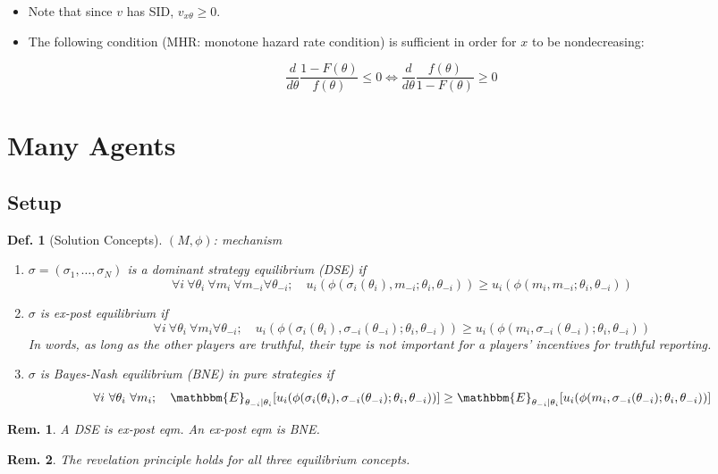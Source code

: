 \documentclass[11pt,a4paper,dvipdfmx]{article}
\theoremstyle{plain}
\newtheorem{df}{Def.}[section]
\newtheorem{rem}{Rem.}[section]
\newcommand{\equi}{\Longleftrightarrow}
\newcommand{\E}{\mathbbm{E}}
\newcommand{\1}{\mathbbm{1}}
\begin{document}
\begin{itemize}
	\item Note that since $v$ has SID, $v_{x \theta} \geq 0$.
	\item The following condition (MHR: monotone hazard rate condition) is sufficient in order for $x$ to be nondecreasing:
\end{itemize}
\[
\frac{d}{d\theta}\frac{1 - F(\theta)}{f(\theta)} \leq 0
\equi \frac{d}{d\theta}\frac{f(\theta)}{1 - F(\theta)} \geq 0
\]


\newpage
\section{Many Agents}

\subsection{Setup}
\begin{df}[Solution Concepts] $(M, \phi)$: mechanism
	\begin{enumerate}
		\item $\sigma = (\sigma_1, \dots, \sigma_N)$ is a dominant strategy equilibrium (DSE) if
		\[
		\forall i \ \forall \theta_i \ \forall m_i \ \forall m_{-i} \forall \theta_{-i}; \quad
		u_i(\phi(\sigma_i(\theta_i), m_{-i} ; \theta_i, \theta_{-i}))
		\geq u_i(\phi(m_i, m_{-i} ; \theta_i, \theta_{-i}))
		\]
		\item $\sigma$ is ex-post equilibrium if
		\[
		\forall i \ \forall \theta_i \ \forall m_i \forall \theta_{-i}; \quad
		u_i(\phi(\sigma_i(\theta_i), \sigma_{-i}(\theta_{-i}) ; \theta_i, \theta_{-i}))
		\geq u_i(\phi(m_i, \sigma_{-i}(\theta_{-i}) ; \theta_i, \theta_{-i}))
		\]
		\textnormal{In words, as long as the other players are truthful, their type is not important for a players' incentives for truthful reporting.}
		\item $\sigma$ is Bayes-Nash equilibrium (BNE) in pure strategies if
		\[
		\forall i \ \forall \theta_i \ \forall m_i; \quad
		\E_{\theta_{-i} \mid \theta_i}[
		u_i(\phi(\sigma_i(\theta_i), \sigma_{-i}(\theta_{-i}) ; \theta_i, \theta_{-i}))]
		\geq
		\E_{\theta_{-i} \mid \theta_i}[u_i(\phi(m_i, \sigma_{-i}(\theta_{-i}) ; \theta_i, \theta_{-i}))]
		\]
	\end{enumerate}
\end{df}
\begin{rem}
	A DSE is ex-post eqm. An ex-post eqm is BNE. 
\end{rem}
\begin{rem}
	The revelation principle holds for all three equilibrium concepts.
\end{rem}
\end{document}
